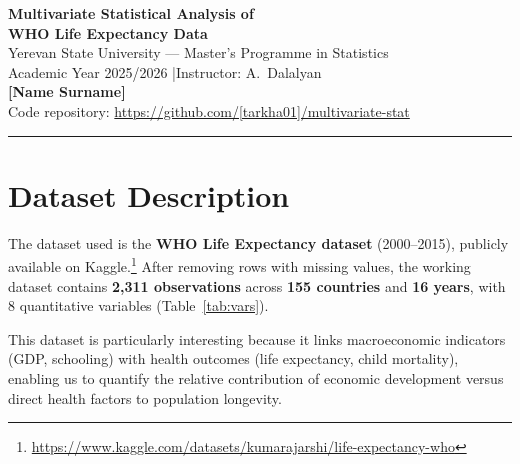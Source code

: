 \documentclass[11pt, a4paper]{article}
\begin{document}
\begin{center}
  {\LARGE\bfseries Multivariate Statistical Analysis of\\[4pt]
  WHO Life Expectancy Data}\\[8pt]
  {\large Yerevan State University — Master's Programme in Statistics}\\[4pt]
  {\normalsize Academic Year 2025/2026 \quad|\quad Instructor: A.\ Dalalyan}\\[4pt]
  {\normalsize \textbf{[Name Surname]}}\\[4pt]
  {\small Code repository: \url{https://github.com/[tarkha01]/multivariate-stat}}
\end{center}

\vspace{-4pt}\hrule\vspace{6pt}

\section{Dataset Description}

The dataset used is the \textbf{WHO Life Expectancy dataset} (2000–2015), 
publicly available on Kaggle.\footnote{%
\url{https://www.kaggle.com/datasets/kumarajarshi/life-expectancy-who}}
After removing rows with missing values, the working dataset contains
\textbf{2{,}311 observations} across \textbf{155 countries} and \textbf{16 years},
with 8 quantitative variables (Table~\ref{tab:vars}).

This dataset is particularly interesting because it links macroeconomic indicators
(GDP, schooling) with health outcomes (life expectancy, child mortality), enabling
us to quantify the relative contribution of economic development versus direct
health factors to population longevity.
\end{document}
